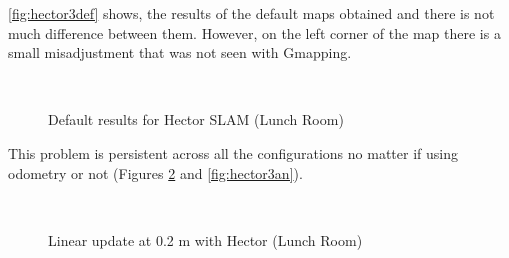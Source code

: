\autoref{fig:hector3def} shows, the results of the default maps obtained and there is not much difference between them. However, on the left corner of the map there is a small misadjustment that was not seen with Gmapping.
\begin{figure}[h]
  \centering
   \quad
   \\
  \caption{Default results for Hector SLAM (Lunch Room)}
  \label{fig:hector3def}
\end{figure}  

This problem is persistent across all the configurations no matter if using odometry or not (Figures \ref{fig:hector3lin} and \ref{fig:hector3an}). 
\begin{figure}[h]
  \centering
   \quad
   \\
  \caption{Linear update at 0.2 m with Hector (Lunch Room)}
  \label{fig:hector3lin}
\end{figure}  

